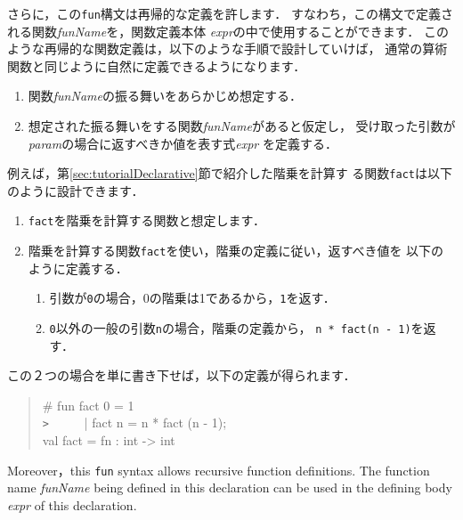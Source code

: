 \documentclass{jbook}
\begin{document}
\ifx\jp%
	さらに，この{\tt fun}構文は再帰的な定義を許します．
	すなわち，この構文で定義される関数{\it funName}を，関数定義本体
{\it expr}の中で使用することができます．
	このような再帰的な関数定義は，以下のような手順で設計していけば，
通常の算術関数と同じように自然に定義できるようになります．
\begin{enumerate}
\item 関数{\it funName}の振る舞いをあらかじめ想定する．
\item 想定された振る舞いをする関数{\it funName}があると仮定し，
受け取った引数が{\it param}の場合に返すべきか値を表す式{\it expr}
を定義する．
\end{enumerate}
	例えば，第\ref{sec:tutorialDeclarative}節で紹介した階乗を計算す
る関数{\tt fact}は以下のように設計できます．
\begin{enumerate}
\item {\tt fact}を階乗を計算する関数と想定します．
\item 階乗を計算する関数{\tt fact}を使い，階乗の定義に従い，返すべき値を
以下のように定義する．
\begin{enumerate}
\item 引数が{\tt 0}の場合，0の階乗は1であるから，{\tt 1}を返す．
\item {\tt 0}以外の一般の引数{\tt n}の場合，階乗の定義から，
{\tt n * fact(n - 1)}を返す．
\end{enumerate}
\end{enumerate}
	この２つの場合を単に書き下せば，以下の定義が得られます．
\begin{tt}
\begin{quote}
\# fun fact 0 = 1\\
\verb|>| \ \ \ \ \ | fact n = n * fact (n - 1);\\
val fact = fn : int -> int
\end{quote}
\end{tt}
\else%
	Moreover，this {\tt fun} syntax allows recursive function
definitions. 
	The function name {\it funName} being defined in this
declaration can be used in the defining body {\it expr} of this
declaration.
\end{document}
